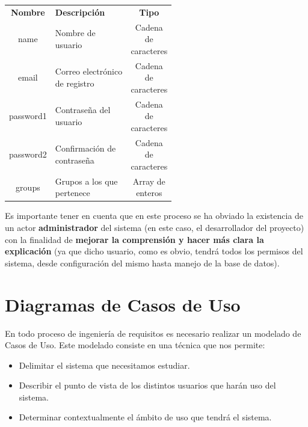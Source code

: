     \begin{table}[H]
        \begin{center}
            \begin{adjustbox}{width=1\textwidth}
                \begin{tabular}{ | c | >{\centering\arraybackslash}p{0.55\linewidth} | c | }
                    \hline
                    \rowcolor{gray!50}  \multicolumn{3}{|l|}{\textbf{Atributos}} \\
                    \hline
                        \textbf{Nombre} & \textbf{Descripción} & \textbf{Tipo} \\
                    \hline
                        name &  Nombre de usuario & Cadena de caracteres \\
                    \hline
                        email &  Correo electrónico de registro & Cadena de caracteres \\
                    \hline
                        password1 &  Contraseña del usuario & Cadena de caracteres \\
                    \hline
                        password2 &  Confirmación de contraseña & Cadena de caracteres \\
                    \hline	
                        groups &  Grupos a los que pertenece & Array de enteros \\
                    \hline	
            \end{tabular}	
            \end{adjustbox}
        \end{center}
    \end{table}

Es importante tener en cuenta que en este proceso se ha obviado la existencia de un actor
\textbf{administrador} del sistema (en este caso, el desarrollador del proyecto) con la
finalidad de \textbf{mejorar la comprensión y hacer más clara la explicación} (ya que dicho
usuario, como es obvio, tendrá todos los permisos del sistema, desde configuración del mismo
hasta manejo de la base de datos).

\section{Diagramas de Casos de Uso}
En todo proceso de ingeniería de requisitos es necesario realizar un modelado de 
Casos de Uso. Este modelado consiste en una técnica que nos permite:

    \begin{itemize}
        \item Delimitar el sistema que necesitamos estudiar.
        \item Describir el punto de vista de los distintos usuarios que harán uso del
        sistema.
        \item Determinar contextualmente el ámbito de uso que tendrá el sistema.
    \end{itemize}

